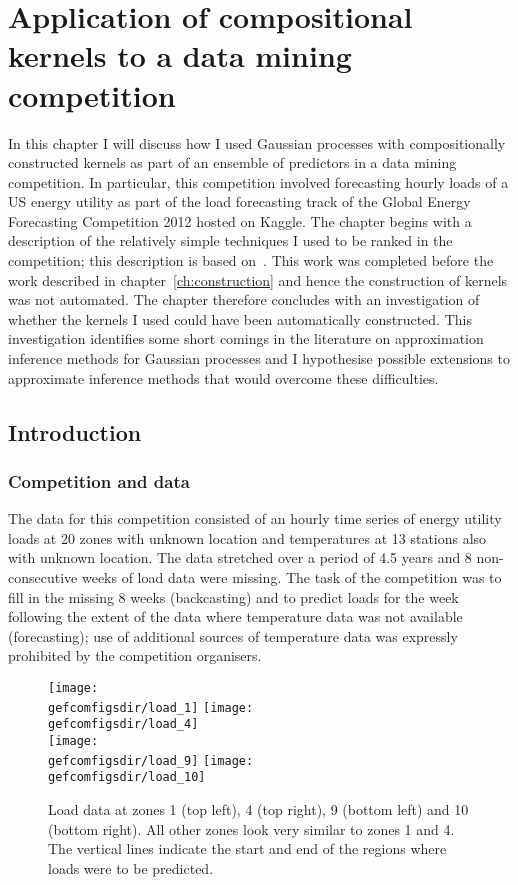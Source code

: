 
\inbpdocument

\chapter{Application of compositional kernels to a data mining competition}
\label{ch:gefcom}

In this chapter I will discuss how I used Gaussian processes with compositionally constructed kernels as part of an ensemble of predictors in a data mining competition.
In particular, this competition involved forecasting hourly loads of a US energy utility as part of the load forecasting track of the Global Energy Forecasting Competition 2012 hosted on Kaggle.
The chapter begins with a description of the relatively simple techniques I used to be ranked  in the competition; this description is based on~\cite{Lloyd2013-yn}.
This work was completed before the work described in chapter~\ref{ch:construction} and hence the construction of kernels was not automated.
The chapter therefore concludes with an investigation of whether the kernels I used could have been automatically constructed.
This investigation identifies some short comings in the literature on approximation inference methods for Gaussian processes and I hypothesise possible extensions to approximate inference methods that would overcome these difficulties.

\section{Introduction}

\subsection{Competition and data}

The data for this competition consisted of an hourly time series of energy utility loads at 20 zones with unknown location and temperatures at 13 stations also with unknown location.
The data stretched over a period of 4.5 years and 8 non-consecutive weeks of load data were missing.
The task of the competition was to fill in the missing 8 weeks (backcasting) and to predict loads for the week following the extent of the data where temperature data was not available (forecasting); use of additional sources of temperature data was expressly prohibited by the competition organisers.

\begin{figure}[ht]
\centering
\texttt{[image: \\gefcomfigsdir/load\_1]}
\texttt{[image: \\gefcomfigsdir/load\_4]} \\
\texttt{[image: \\gefcomfigsdir/load\_9]}
\texttt{[image: \\gefcomfigsdir/load\_10]}
\caption[Example load data from GEFCom.]{
Load data at zones 1 (top left), 4 (top right), 9 (bottom left) and 10 (bottom right).
All other zones look very similar to zones 1 and 4.
The vertical lines indicate the start and end of the regions where loads were to be predicted.
}
\label{fig:gefcom:exampleload}
\end{figure}

